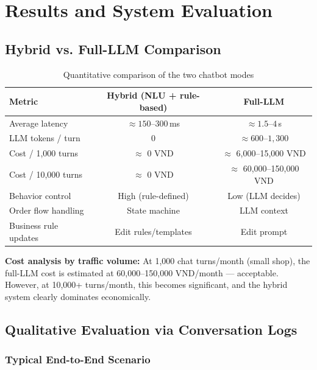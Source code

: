 \documentclass[12pt, a4paper]{report}
\begin{document}
\chapter{Results and System Evaluation}

\section{Hybrid vs. Full-LLM Comparison}

\begin{table}[H]
\centering
\caption{Quantitative comparison of the two chatbot modes}
\label{tab:compare_modes}
\begin{tabular}{lcc}
\toprule
\textbf{Metric} & \textbf{Hybrid (NLU + rule-based)} & \textbf{Full-LLM} \\
\midrule
Average latency       & $\approx 150$--$300$\,ms   & $\approx 1.5$--$4$\,s \\
LLM tokens / turn     & 0                          & $\approx 600$--$1{,}300$ \\
Cost / 1,000 turns    & $\approx$ 0 VND            & $\approx$ 6,000--15,000 VND \\
Cost / 10,000 turns   & $\approx$ 0 VND            & $\approx$ 60,000--150,000 VND \\
Behavior control      & High (rule-defined)        & Low (LLM decides) \\
Order flow handling   & State machine              & LLM context \\
Business rule updates & Edit rules/templates       & Edit prompt \\
\bottomrule
\end{tabular}
\end{table}

\textbf{Cost analysis by traffic volume:}
At 1,000 chat turns/month (small shop), the full-LLM cost is estimated at
60,000--150,000 VND/month --- acceptable.
However, at 10,000+ turns/month, this becomes significant,
and the hybrid system clearly dominates economically.

\section{Qualitative Evaluation via Conversation Logs}

\subsection{Typical End-to-End Scenario}
\end{document}
